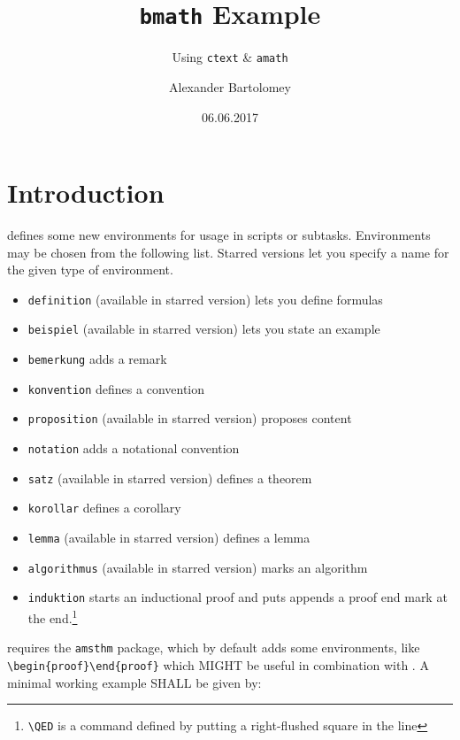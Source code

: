 \documentclass{ctext}
\title{\texttt{bmath} Example}
\subtitle{Using \texttt{ctext} \& \texttt{amath}}
\author{Alexander Bartolomey}
\date{06.06.2017}
\begin{document}
\maketitle
\tableofcontents*
\section{Introduction}
\bmath defines some new environments for usage in scripts or subtasks. Environments may be chosen from the following list. Starred versions let you specify a name for the given type of environment.
\begin{itemize}
  \item \verb|definition| (available in starred version) lets you define formulas
  \item \verb|beispiel| (available in starred version) lets you state an example
  \item \verb|bemerkung| adds a remark
  \item \verb|konvention| defines a convention
  \item \verb|proposition| (available in starred version) proposes content
  \item \verb|notation| adds a notational convention
  \item \verb|satz| (available in starred version) defines a theorem
  \item \verb|korollar| defines a corollary
  \item \verb|lemma| (available in starred version) defines a lemma
  \item \verb|algorithmus| (available in starred version) marks an algorithm
  \item \verb|induktion| starts an inductional proof and puts appends a proof end mark at the end.\footnote{\texttt{\textbackslash QED} is a command defined by \bmath putting a right-flushed square in the line}
\end{itemize}
\bmath requires the \texttt{amsthm} package, which by default adds some environments, like \verb|\begin{proof}\end{proof}| which MIGHT be useful in combination with \bmath.
A minimal working example SHALL be given by:
\end{document}
